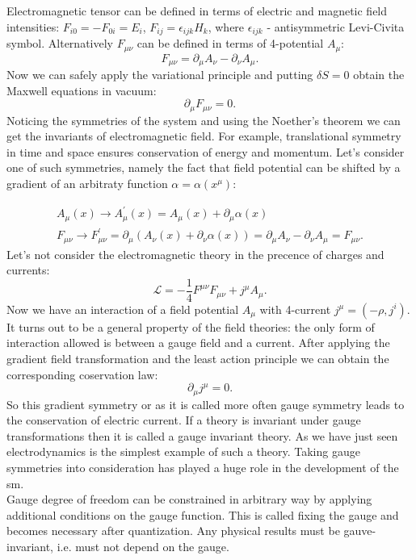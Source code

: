 Electromagnetic tensor can be defined in terms of electric and magnetic field intensities: $F_{i0}=-F_{0i} = E_i$, $F_{ij} = \epsilon_{ijk}H_k$, where $\epsilon_{ijk}$ - antisymmetric Levi-Civita symbol. Alternatively $F_{\mu \nu}$ can be defined in terms of 4-potential $A_{\mu}$:
 \begin{equation}
F_{\mu \nu} = \partial_{\mu}A_{\nu} - \partial_{\nu}A_{\mu}.
\end{equation}
Now we can safely apply the variational principle and putting $\delta S=0$ obtain the Maxwell equations in vacuum:
 \begin{equation}
\partial_{\mu}F_{\mu \nu} = 0.
\end{equation}
Noticing the symmetries of the system and using the Noether's theorem\cite{Noether1918} we can get the invariants of electromagnetic field. For example, translational symmetry in time and space ensures conservation of energy and momentum. Let's consider one of such symmetries, namely the fact that field potential can be shifted by a gradient of an arbitraty function $\alpha=\alpha(x^\mu)$:

\begin{equation}
\begin{array}{lcl} 
A_{\mu}(x) \rightarrow A^{\prime}_{\mu}(x)  = A_{\mu}(x)+\partial_{\mu}\alpha(x)  \\ 
F_{\mu \nu} \rightarrow F^{\prime}_{\mu \nu}  = \partial_{\mu}(A_{\nu}(x)+\partial_{\nu}\alpha(x))=\partial_{\mu}A_{\nu} - \partial_{\nu}A_{\mu}=F_{\mu \nu}.
\end{array} 
\end{equation}
Let's not consider the electromagnetic theory in the precence of charges and currents:
 \begin{equation}
\mathcal{L} = -\frac{1}{4} F^{\mu \nu}F_{\mu \nu} + j^{\mu}A_{\mu}.
\end{equation}
Now we have an interaction of a field potential $A_{\mu}$ with 4-current $j^{\mu}=(-\rho,j^{i})$. It turns out to be a general property of the field theories: the only form of interaction allowed is between a gauge field and a current.  After applying the gradient field transformation and the least action principle we can obtain the corresponding coservation law:
\begin{equation}
\partial_{\mu}j^{\mu}=0.
\end{equation}
 So this gradient symmetry\cite{bogol} or as it is called more often gauge symmetry leads to the conservation of electric current. If a theory is invariant under gauge transformations then it is called a gauge invariant theory. As we have just seen electrodynamics is the simplest example of such a theory. Taking gauge symmetries into consideration \cite{YangMills} has played a huge role in the development of the \gls{sm}.\\
 Gauge degree of freedom can be constrained in arbitrary way by applying additional conditions on the gauge function. This is called fixing the gauge and becomes necessary after quantization. Any physical results must be gauve-invariant, i.e. must not depend on the gauge. 


